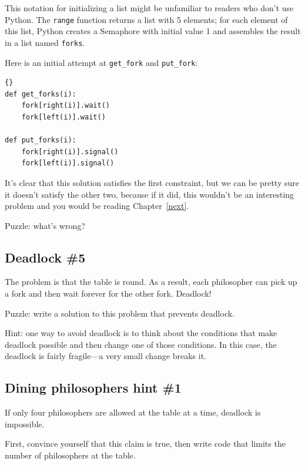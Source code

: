 \documentclass{book}
\newcommand{\clearemptydoublepage}{\newpage\cleardoublepage}
\begin{document}
This notation for initializing a list might be unfamiliar to
readers who don't use Python.  The {\tt range} function returns
a list with 5 elements; for each element of this list, Python
creates a Semaphore with initial value 1 and assembles the
result in a list named {\tt forks}.

Here is an initial attempt at {\tt get\_fork} and {\tt put\_fork}:

\begin{latin}
\begin{latin}
\begin{lstlisting}[title={Dining philosophers non-solution}]{}
def get_forks(i):
    fork[right(i)].wait()
    fork[left(i)].wait()

def put_forks(i):
    fork[right(i)].signal()
    fork[left(i)].signal()
\end{lstlisting}
\end{latin}
\end{latin}

It's clear that this solution satisfies the first constraint, but
we can be pretty sure it doesn't satisfy the other two, because
if it did, this wouldn't be an interesting problem and you would
be reading Chapter~\ref{next}.

Puzzle: what's wrong?


\clearemptydoublepage
\subsection{Deadlock \#5}

The problem is that the table is round.  As a result, each philosopher
can pick up a fork and then wait forever for the other fork.  Deadlock!

Puzzle: write a solution to this problem that prevents deadlock.

Hint: one way to avoid deadlock is to think about the conditions
that make deadlock possible and then change one of those conditions.
In this case, the deadlock is fairly fragile---a very small change
breaks it.

\clearemptydoublepage
\subsection{Dining philosophers hint \#1}

If only four philosophers are allowed at the table at a time,
deadlock is impossible.

First, convince yourself that this claim is true, then write code that
limits the number of philosophers at the table.
\end{document}

